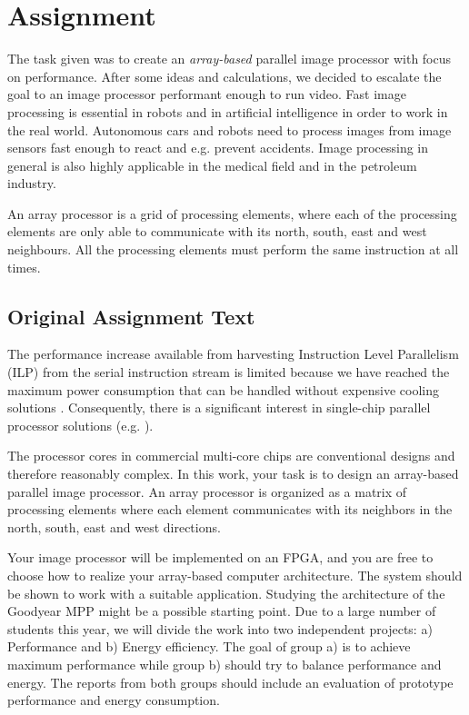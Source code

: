 \section{Assignment}
The task given was to create an {\em array-based} parallel image processor with
focus on performance. After some ideas and calculations, we decided to escalate
the goal to an image processor performant enough to run video. Fast image
processing is essential in robots and in artificial intelligence in order to
work in the real world. Autonomous cars and robots need to process images from
image sensors fast enough to react and e.g. prevent accidents. Image processing
in general is also highly applicable in the medical field and in the petroleum
industry.

An array processor is a grid of processing elements, where each of the
processing elements are only able to communicate with its north, south, east and
west neighbours. All the processing elements must perform the same instruction
at all times.


\subsection{Original Assignment Text}

The performance increase available from harvesting Instruction Level Parallelism
(ILP) from the serial instruction stream is limited because we have reached the
maximum power consumption that can be handled without expensive cooling
solutions \cite{olukotun2005future}. Consequently, there is a significant
interest in single-chip parallel processor solutions (e.g. \cite{bell2008tile64,
  kongetira2005niagara}).

The processor cores in commercial multi-core chips are conventional designs and
therefore reasonably complex. In this work, your task is to design an
array-based parallel image processor. An array processor is organized as a
matrix of processing elements where each element communicates with its neighbors
in the north, south, east and west directions.

Your image processor will be implemented on an FPGA, and you are free to choose
how to realize your array-based computer architecture. The system should be
shown to work with a suitable application. Studying the architecture of the
Goodyear MPP \cite{batcher1980design,wiki:goodyear} might be a possible starting
point.  Due to a large number of students this year, we will divide the work
into two independent projects: a) Performance and b) Energy efficiency. The goal
of group a) is to achieve maximum performance while group b) should try to
balance performance and energy. The reports from both groups should include an
evaluation of prototype performance and energy consumption.

